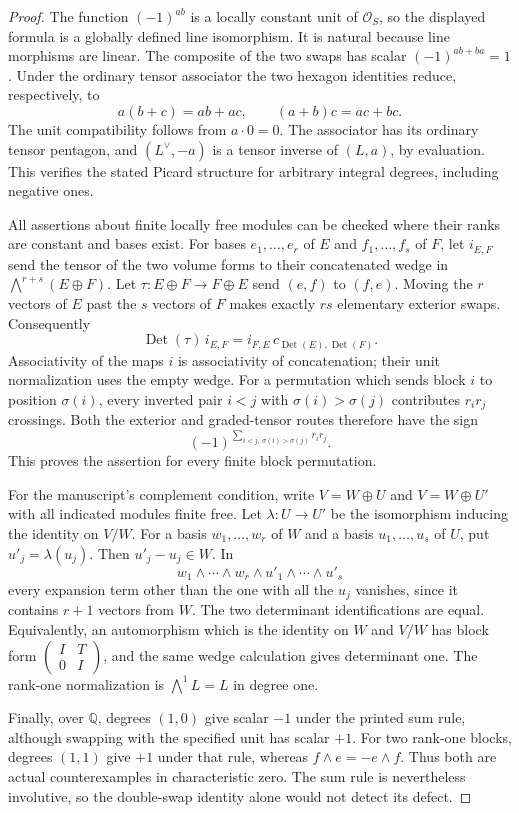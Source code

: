 \begin{proof}
The function $(-1)^{ab}$ is a locally constant unit of
$\mathcal O_S$, so the displayed formula is a globally defined line
isomorphism.  It is natural because line morphisms are linear.
The composite of the two swaps has scalar
$(-1)^{ab+ba}=1$.  Under the ordinary tensor associator the two
hexagon identities reduce, respectively, to
\[
 a(b+c)=ab+ac,\qquad (a+b)c=ac+bc.
\]
The unit compatibility follows from $a\cdot0=0$.
The associator has its ordinary tensor pentagon, and
$(L^\vee,-a)$ is a tensor inverse of $(L,a)$, by evaluation.
This verifies the stated Picard structure for arbitrary integral
degrees, including negative ones.

All assertions about finite locally free modules can be checked where
their ranks are constant and bases exist.  For bases
$e_1,\ldots,e_r$ of $E$ and $f_1,\ldots,f_s$ of $F$, let
$i_{E,F}$ send the tensor of the two volume forms to their concatenated
wedge in $\bigwedge^{r+s}(E\oplus F)$.  Let
$\tau:E\oplus F\to F\oplus E$ send $(e,f)$ to $(f,e)$.
Moving the $r$ vectors of $E$ past the $s$ vectors of $F$ makes exactly
$rs$ elementary exterior swaps.  Consequently
\[
 \operatorname{Det}(\tau)\,i_{E,F}
       =i_{F,E}\,c_{\operatorname{Det}(E),\operatorname{Det}(F)}.
\]
Associativity of the maps $i$ is associativity of concatenation;
their unit normalization uses the empty wedge.  For a permutation
which sends block $i$ to position $\sigma(i)$, every inverted pair
$i<j$ with $\sigma(i)>\sigma(j)$ contributes $r_i r_j$ crossings.
Both the exterior and graded-tensor routes therefore have the sign
\[
 (-1)^{\sum_{i<j,\ \sigma(i)>\sigma(j)}r_i r_j}.
\]
This proves the assertion for every finite block permutation.

For the manuscript's complement condition, write $V=W\oplus U$
and $V=W\oplus U'$ with all indicated modules finite free.
Let $\lambda:U\to U'$ be the isomorphism inducing the identity
on $V/W$.  For a basis $w_1,\ldots,w_r$ of $W$ and a basis
$u_1,\ldots,u_s$ of $U$, put $u'_j=\lambda(u_j)$.
Then $u'_j-u_j\in W$.  In
\[
 w_1\wedge\cdots\wedge w_r\wedge u'_1\wedge\cdots\wedge u'_s
\]
every expansion term other than the one with all the $u_j$ vanishes,
since it contains $r+1$ vectors from $W$.  The two determinant
identifications are equal.  Equivalently, an automorphism which is
the identity on $W$ and $V/W$ has block form
$\left(\begin{smallmatrix}I&T\\0&I\end{smallmatrix}\right)$,
and the same wedge calculation gives determinant one.  The rank-one
normalization is $\bigwedge^1L=L$ in degree one.

Finally, over $\mathbb Q$, degrees $(1,0)$ give scalar $-1$ under
the printed sum rule, although swapping with the specified unit has
scalar $+1$.  For two rank-one blocks, degrees $(1,1)$ give $+1$
under that rule, whereas $f\wedge e=-e\wedge f$.  Thus both are
actual counterexamples in characteristic zero.  The sum rule is
nevertheless involutive, so the double-swap identity alone would not
detect its defect.
\end{proof}

